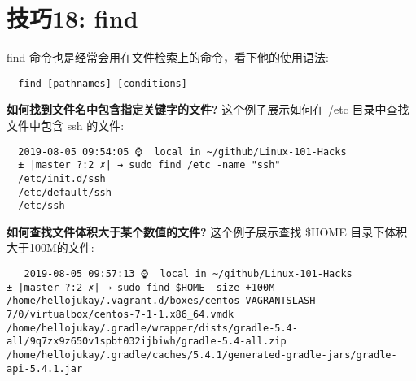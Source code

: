 \documentclass[UTF8]{ctexart}
\begin{document}
\section*{技巧18: find}
find 命令也是经常会用在文件检索上的命令，看下他的使用语法:
\begin{lstlisting}
  find [pathnames] [conditions]
\end{lstlisting}
\textbf{如何找到文件名中包含指定关键字的文件?}\newline
这个例子展示如何在 /etc 目录中查找文件中包含 ssh 的文件:
\begin{lstlisting}
  2019-08-05 09:54:05 ⌚  local in ~/github/Linux-101-Hacks
  ± |master ?:2 ✗| → sudo find /etc -name "ssh"
  /etc/init.d/ssh
  /etc/default/ssh
  /etc/ssh  
\end{lstlisting}
\textbf{如何查找文件体积大于某个数值的文件?}\newline
这个例子展示查找 \$HOME 目录下体积大于100M的文件:
\begin{lstlisting}
   2019-08-05 09:57:13 ⌚  local in ~/github/Linux-101-Hacks
± |master ?:2 ✗| → sudo find $HOME -size +100M
/home/hellojukay/.vagrant.d/boxes/centos-VAGRANTSLASH-7/0/virtualbox/centos-7-1-1.x86_64.vmdk
/home/hellojukay/.gradle/wrapper/dists/gradle-5.4-all/9q7zx9z650v1spbt032ijbiwh/gradle-5.4-all.zip
/home/hellojukay/.gradle/caches/5.4.1/generated-gradle-jars/gradle-api-5.4.1.jar
\end{lstlisting}
\end{document}
